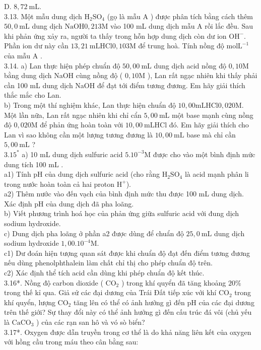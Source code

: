 \documentclass[10pt]{article}
\begin{document}
D. $8,72 \mathrm{~mL}$.\\
3.13. Một mẫu dung dịch $\mathrm{H}_{2} \mathrm{SO}_{4}$ (gọ là mẫu A ) được phân tích bằng cách thêm $50,0 \mathrm{~mL}$ dung dịch $\mathrm{NaOH} 0,213 \mathrm{M}$ vào 100 mL dung dịch mẫu A rồi lắc đều. Sau khi phản ứng xảy ra, người ta thấy trong hỗn hợp dung dịch còn dư ion $\mathrm{OH}^{-}$. Phần ion dư này cần $13,21 \mathrm{~mL} \mathrm{HCl} 0,103 \mathrm{M}$ để trung hoà. Tính nồng độ $\mathrm{mol} \mathrm{L}^{-1}$ của mẫu A .\\
3.14. a) Lan thực hiện phép chuẩn độ $50,00 \mathrm{~mL}$ dung dịch acid nồng độ $0,10 \mathrm{M}$ bằng dung dịch NaOH cùng nồng độ ( $0,10 \mathrm{M}$ ), Lan rất ngạc nhiên khi thấy phải cần 100 mL dung dịch NaOH để đạt tới điểm tương đương. Em hãy giải thích thắc mắc cho Lan.\\
b) Trong một thí nghiệm khác, Lan thực hiện chuẩn độ $10,00 \mathrm{mLHCl} 0,020 \mathrm{M}$. Một lần nữa, Lan rất ngạc nhiên khi chỉ cẩn $5,00 \mathrm{~mL}$ một base mạnh cùng nồng độ $0,020 \mathrm{M}$ để phản ứng hoàn toàn với $10,00 \mathrm{~mL} \mathrm{HCl}$ đó. Em hãy giải thích cho Lan vì sao không cần một lượng tương đương là $10,00 \mathrm{~mL}$ base mà chỉ cần $5,00 \mathrm{~mL}$ ?\\
$3.15^{*}$ a) 10 mL dung dịch sulfuric acid $5.10^{-3} \mathrm{M}$ được cho vào một bình định mức dung tích 100 mL .\\
a1) Tính pH của dung dịch sulfuric acid (cho rằng $\mathrm{H}_{2} \mathrm{SO}_{4}$ là acid mạnh phân li trong nước hoàn toàn cả hai proton $\mathrm{H}^{+}$).\\
a2) Thêm nước vào đến vạch của bình định mức thu được 100 mL dung dịch. Xác định pH của dung dịch đã pha loãng.\\
b) Viết phương trình hoá học của phản ứng giữa sulfuric acid với đung dịch sodium hydroxide.\\
c) Dung dịch pha loãng ở phần a2 được dùng để chuẩn độ $25,0 \mathrm{~mL}$ dung dịch sodium hydroxide $1,00.10^{-4} \mathrm{M}$.\\
c1) Dư đoán hiện tượng quan sát được khi chuẩn độ đạt đến điểm tương đương nếu dùng phenolphthalein làm chất chỉ thị cho phép chuẩn độ trên.\\
c2) Xác định thể tích acid cần dùng khi phép chuẩn độ kết thúc.\\
3.16*. Nồng độ carbon dioxide ( $\mathrm{CO}_{2}$ ) trong khí quyển đã tăng khoảng $20 \%$ trong thế kỉ qua. Giả sử các đại dương của Trái Đất tiếp xúc với khí $\mathrm{CO}_{2}$ trong khí quyển, lượng $\mathrm{CO}_{2}$ tăng lên có thể có ảnh hưởng gì đến pH của các đại dương trên thế giới? Sự thay đổi này có thể ảnh hưởng gì đến cấu trúc đá vôi (chủ yếu là $\mathrm{CaCO}_{3}$ ) của các rạn san hô và vó sò biển?\\
3.17*. Oxygen được dẫn truyền trong cơ thể là do khả năng liên kết của oxygen với hồng cầu trong máu theo cân bằng sau:
\end{document}
